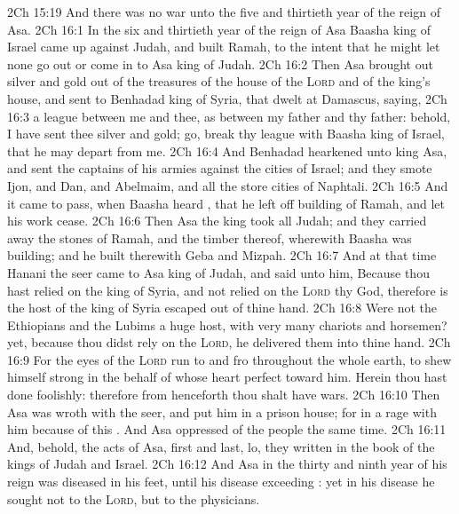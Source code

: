 \vs 2Ch 15:19 And there was no  war unto the five and thirtieth year of the reign of Asa.
\vs 2Ch 16:1 In the six and thirtieth year of the reign of Asa Baasha king of Israel came up against Judah, and built Ramah, to the intent that he might let none go out or come in to Asa king of Judah.
\vs 2Ch 16:2 Then Asa brought out silver and gold out of the treasures of the house of the \textsc{Lord} and of the king's house, and sent to Benhadad king of Syria, that dwelt at Damascus, saying,
\vs 2Ch 16:3  a league between me and thee, as  between my father and thy father: behold, I have sent thee silver and gold; go, break thy league with Baasha king of Israel, that he may depart from me.
\vs 2Ch 16:4 And Benhadad hearkened unto king Asa, and sent the captains of his armies against the cities of Israel; and they smote Ijon, and Dan, and Abelmaim, and all the store cities of Naphtali.
\vs 2Ch 16:5 And it came to pass, when Baasha heard , that he left off building of Ramah, and let his work cease.
\vs 2Ch 16:6 Then Asa the king took all Judah; and they carried away the stones of Ramah, and the timber thereof, wherewith Baasha was building; and he built therewith Geba and Mizpah.
\vs 2Ch 16:7 And at that time Hanani the seer came to Asa king of Judah, and said unto him, Because thou hast relied on the king of Syria, and not relied on the \textsc{Lord} thy God, therefore is the host of the king of Syria escaped out of thine hand.
\vs 2Ch 16:8 Were not the Ethiopians and the Lubims a huge host, with very many chariots and horsemen? yet, because thou didst rely on the \textsc{Lord}, he delivered them into thine hand.
\vs 2Ch 16:9 For the eyes of the \textsc{Lord} run to and fro throughout the whole earth, to shew himself strong in the behalf of  whose heart  perfect toward him. Herein thou hast done foolishly: therefore from henceforth thou shalt have wars.
\vs 2Ch 16:10 Then Asa was wroth with the seer, and put him in a prison house; for  in a rage with him because of this . And Asa oppressed  of the people the same time.
\vs 2Ch 16:11 And, behold, the acts of Asa, first and last, lo, they  written in the book of the kings of Judah and Israel.
\vs 2Ch 16:12 And Asa in the thirty and ninth year of his reign was diseased in his feet, until his disease  exceeding : yet in his disease he sought not to the \textsc{Lord}, but to the physicians.
